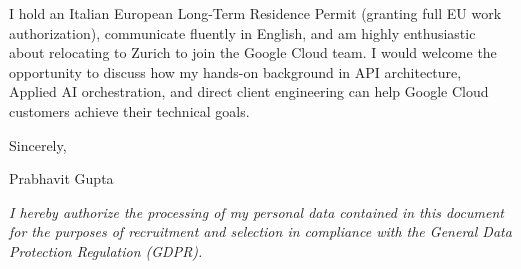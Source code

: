 \documentclass[10.5pt,a4paper]{article}
\begin{document}
I hold an Italian European Long-Term Residence Permit (granting full EU work authorization), communicate fluently in English, and am highly enthusiastic about relocating to Zurich to join the Google Cloud team. I would welcome the opportunity to discuss how my hands-on background in API architecture, Applied AI orchestration, and direct client engineering can help Google Cloud customers achieve their technical goals.

Sincerely,

Prabhavit Gupta

\vspace{0.8em}
{\footnotesize \textit{I hereby authorize the processing of my personal data contained in this document for the purposes of recruitment and selection in compliance with the General Data Protection Regulation (GDPR).}\par}
\end{document}
